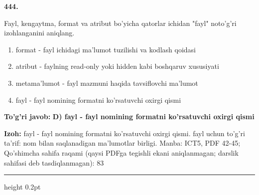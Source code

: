 \documentclass[10pt,a4paper]{article}
\begin{document}
{\bfseries\sffamily\color{ink} 444.}
\par
Fayl, kengaytma, format va atribut bo'yicha qatorlar ichidan "fayl" noto'g'ri izohlanganini aniqlang.
\begin{enumerate}[label=\Alph*),leftmargin=9mm]
\item format - fayl ichidagi ma'lumot tuzilishi va kodlash qoidasi
\item atribut - faylning read-only yoki hidden kabi boshqaruv xususiyati
\item metama'lumot - fayl mazmuni haqida tavsiflovchi ma'lumot
\item fayl - fayl nomining formatni ko'rsatuvchi oxirgi qismi
\end{enumerate}
\begin{tcolorbox}[enhanced,breakable,colback=teal!4,colframe=teal!60!black,boxrule=0.45pt,arc=1.2mm,left=2.7mm,right=2.7mm,top=1.8mm,bottom=1.8mm,before skip=2mm,after skip=2mm]
{\bfseries\sffamily\color{teal}To'g'ri javob:} \textbf{D) fayl - fayl nomining formatni ko'rsatuvchi oxirgi qismi}
\par\smallskip
{\bfseries Izoh:} fayl - fayl nomining formatni ko'rsatuvchi oxirgi qismi. fayl uchun to'g'ri ta'rif: nom bilan saqlanadigan ma'lumotlar birligi. Manba: ICT5, PDF 42-45; Qo'shimcha sahifa raqami (qaysi PDFga tegishli ekani aniqlanmagan; darslik sahifasi deb tasdiqlanmagan): 83
\end{tcolorbox}
\vspace{2mm}\hrule height 0.2pt\vspace{3mm}
\end{document}
